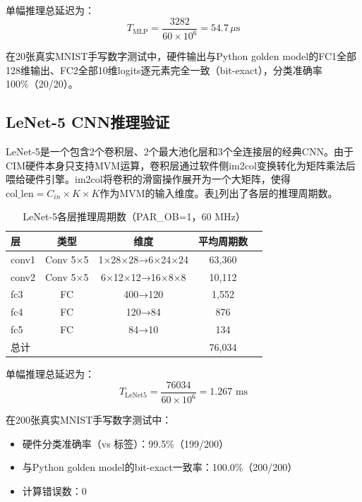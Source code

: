 \documentclass[12pt, a4paper]{article}
\begin{document}
单幅推理总延迟为：
\begin{equation}
	T_{\text{MLP}} = \frac{3282}{60 \times 10^6} = 54.7\,\mu\mathrm{s}
\end{equation}

在20张真实MNIST手写数字测试中，硬件输出与Python golden model的FC1全部128维输出、FC2全部10维logits逐元素完全一致（bit-exact），分类准确率100\%（20/20）。

\subsection{LeNet-5 CNN推理验证}

LeNet-5是一个包含2个卷积层、2个最大池化层和3个全连接层的经典CNN。由于CIM硬件本身只支持MVM运算，卷积层通过软件侧im2col变换转化为矩阵乘法后喂给硬件引擎。im2col将卷积的滑窗操作展开为一个大矩阵，使得$\text{col\_len} = C_{in} \times K \times K$作为MVM的输入维度。表\ref{tab:lenet5_perf}列出了各层的推理周期数。

\begin{table}[H]
	\centering
	\caption{LeNet-5各层推理周期数（PAR\_OB=1，60 MHz）}
	\begin{tabular}{lcccc}
		\toprule
		层 & 类型 & 维度 & 平均周期数 \\
		\midrule
		conv1 & Conv 5×5 & 1×28×28→6×24×24 & 63,360 \\
		conv2 & Conv 5×5 & 6×12×12→16×8×8 & 10,112 \\
		fc3 & FC & 400→120 & 1,552 \\
		fc4 & FC & 120→84 & 876 \\
		fc5 & FC & 84→10 & 134 \\
		\midrule
		总计 & & & 76,034 \\
		\bottomrule
	\end{tabular}
	\label{tab:lenet5_perf}
\end{table}

单幅推理总延迟为：
\begin{equation}
	T_{\text{LeNet5}} = \frac{76034}{60 \times 10^6} = 1.267 \text{ ms}
\end{equation}

在200张真实MNIST手写数字测试中：
\begin{itemize}
	\item 硬件分类准确率（vs 标签）：99.5\%（199/200）
	\item 与Python golden model的bit-exact一致率：100.0\%（200/200）
	\item 计算错误数：0
\end{itemize}
\end{document}
